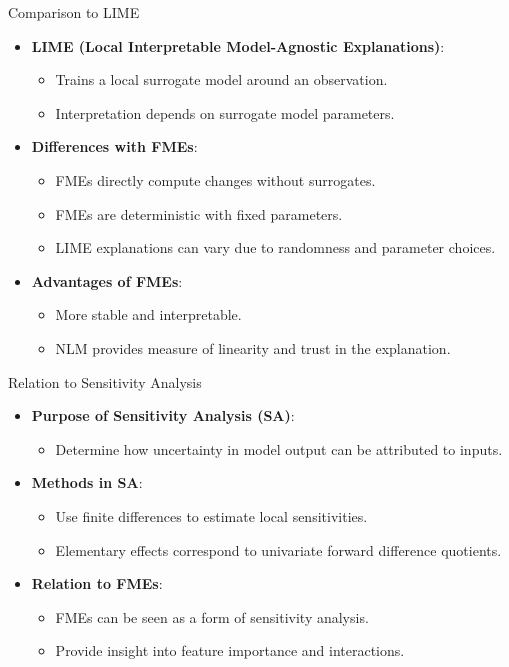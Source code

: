 \documentclass[11pt,compress,t,notes=noshow, aspectratio=169, xcolor=table]{beamer}
\begin{document}
\begin{frame}{Comparison to LIME}
\begin{itemize}
\item \textbf{LIME (Local Interpretable Model-Agnostic Explanations)}:
\begin{itemize}
\item Trains a local surrogate model around an observation.
\item Interpretation depends on surrogate model parameters.
\end{itemize}
\item \textbf{Differences with FMEs}:
\begin{itemize}
\item FMEs directly compute changes without surrogates.
\item FMEs are deterministic with fixed parameters.
\item LIME explanations can vary due to randomness and parameter choices.
\end{itemize}
\item \textbf{Advantages of FMEs}:
\begin{itemize}
\item More stable and interpretable.
\item NLM provides measure of linearity and trust in the explanation.
\end{itemize}
\end{itemize}
\end{frame}

\begin{frame}{Relation to Sensitivity Analysis}
\begin{itemize}
\item \textbf{Purpose of Sensitivity Analysis (SA)}:
\begin{itemize}
\item Determine how uncertainty in model output can be attributed to inputs.
\end{itemize}
\item \textbf{Methods in SA}:
\begin{itemize}
\item Use finite differences to estimate local sensitivities.
\item Elementary effects correspond to univariate forward difference quotients.
\end{itemize}
\item \textbf{Relation to FMEs}:
\begin{itemize}
\item FMEs can be seen as a form of sensitivity analysis.
\item Provide insight into feature importance and interactions.
\end{itemize}
\end{itemize}
\end{frame}
\end{document}
